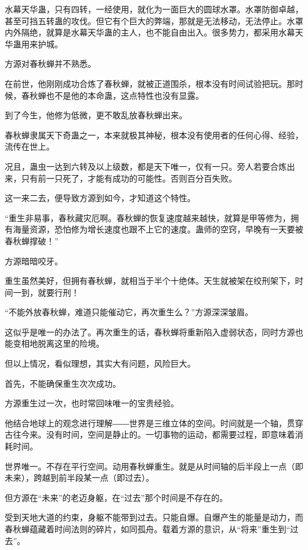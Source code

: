 
\begin{this_body}

水幕天华蛊，只有四转，一经使用，就化为一面巨大的圆球水罩。水罩防御卓越，甚至可挡五转蛊的攻伐。但它有个巨大的弊端，那就是无法移动，无法停止。水罩内外隔绝，就算是水幕天华蛊的主人，也不能自由出入。很多势力，都采用水幕天华蛊用来护城。

方源对春秋蝉并不熟悉。

在前世，他刚刚成功合炼了春秋蝉，就被正道围杀，根本没有时间试验把玩。那时候，春秋蝉也不是他的本命蛊，这点特性也没有显露。

到了今生，他修为低微，更不敢乱放春秋蝉出来。

春秋蝉隶属天下奇蛊之一，本来就极其神秘，根本没有使用者的任何心得、经验，流传在世上。

况且，蛊虫一达到六转及以上级数，都是天下唯一，仅有一只。旁人若要合炼出来，只有前一只死了，才能有成功的可能性。否则百分百失败。

这一来二去，便导致方源到如今，才知道这个特性。

“重生非易事，春秋藏灾厄啊。春秋蝉的恢复速度越来越快，就算是甲等修为，拥有海量资源，恐怕修为增长速度也跟不上它的速度。蛊师的空窍，早晚有一天要被春秋蝉撑破！”

方源暗暗咬牙。

重生虽然美好，但拥有春秋蝉，就相当于半个十绝体。天生就被架在绞刑架下，时间一到，就要行刑！

“不能外放春秋蝉，难道只能催动它，再次重生么？”方源深深皱眉。

这似乎是唯一的办法了。再次重生的话，春秋蝉将重新陷入虚弱状态，同时方源也能变相地脱离这里的险境。

但以上情况，看似理想，其实大有问题，风险巨大。

首先，不能确保重生次次成功。

方源重生过一次，也时常回味唯一的宝贵经验。

他结合地球上的观念进行理解――世界是三维立体的空间。时间就是一个轴，贯穿古往今来。没有时间，空间是静止的。一切事物的运动，都需要过程，即意味着消耗时间。

世界唯一。不存在平行空间。动用春秋蝉重生。就是从时间轴的后半段上一点（即未来），跨越到前半段某一点（即过去）。

但方源在“未来”的老迈身躯，在“过去”那个时间是不存在的。

受到天地大道的约束，身躯不能带到过去。只能自爆。自爆产生的能量是动力，而春秋蝉蕴藏着时间法则的碎片，如同孤舟。载着方源的意识，从“将来”重生到“过去”。


\end{this_body}
